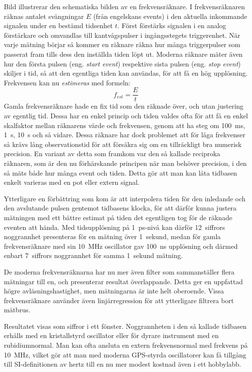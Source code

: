 Bild  illustrerar den schematiska bilden av en
frekvensräknare.
I frekvensräknaren räknas antalet svängningar \(E\) (från engelskans events)
i den aktuella inkommande signalen under en bestämd tidsenhet \(t\).
Först förstärks signalen i en analog förstärkare och omvandlas till
kantvågspulser i ingångsstegets triggerenhet.
När varje mätning börjar så kommer en räknare räkna hur många triggerpulser
som passerat fram tills dess den inställda tiden löpt ut.
Moderna räknare mäter även hur den första pulsen (eng. \emph{start event})
respektive sista pulsen (eng. \emph{stop event}) skiljer i tid, så att den
egentliga tiden kan användas, för att få en hög upplösning.
Frekvensen kan nu \emph{estimeras} med formeln:
\[f_{est} = \dfrac{E}{t}\]
Gamla frekvensräknare hade en fix tid som den räknade över, och utan justering
av egentlig tid.
Dessa har en enkel princip och tiden valdes ofta för att få en enkel skalfaktor
mellan räknarens värde och frekvensen, genom att ha steg om
\qty{100}{\milli\second}, \qty{1}{\second}, \qty{10}{\second} och så vidare.
Dessa räknare har dock problemet att för låga frekvenser så krävs lång
observationstid för att försäkra sig om en tillräckligt bra numerisk precision.
En variant av detta som framkom var den så kallade reciproka räknaren, som är
den nu förhärskande principen när man behöver precision, i den så mäts både
hur många event och tiden.
Detta gör att man kan låta tidbasen enkelt varieras med en pot eller extern
signal.

Ytterligare en förbättring som kom är att interpolera tiden för den inledande
och den avslutande pulsen gentemot tidbasens klocka, för att därför kunna
justera mätningen med ett bättre estimat på tiden det egentligen tog för de
räknade eventen att hända.
Med tidsupplösning på 1~ps-nivå kan därför 12~siffrors noggrannhet presenteras
för en mätning över 1~sekund, medan för gamla frekvensräknare med sin
\qty{10}{\mega\hertz} oscillator gav \qty{100}{\nano\second} upplösning och därmed
enbart 7~siffrors noggrannhet för samma 1~sekund mätning.

De moderna frekvensräknarna har nu mer även filter som sammanställer flera
mätningar till en, och presenterar resultat överlappande.
Detta ger en uppfattad högre avläsningshastighet, men mätningarna är inte helt
oberoende.
Vissa frekvensräknare använder även linjärregression för att ytterligare
filtrera bort mätbrus.

Resultatet visas som siffror i ett fönster.
Noggrannheten i den så kallade tidbasen erhålls med en kristallstyrd oscillator
eller för dyrare instrument med en rubidiumnormal.
Man kan ofta ansluta en extern frekvensnormal med frekvens på \qty{10}{\mega\hertz},
vilket gör att man med moderna GPS-styrda oscillatorer kan få tillgång till
SI-definitionen av hertz till en nu mer modest kostnad även i ett hobbylabb.

